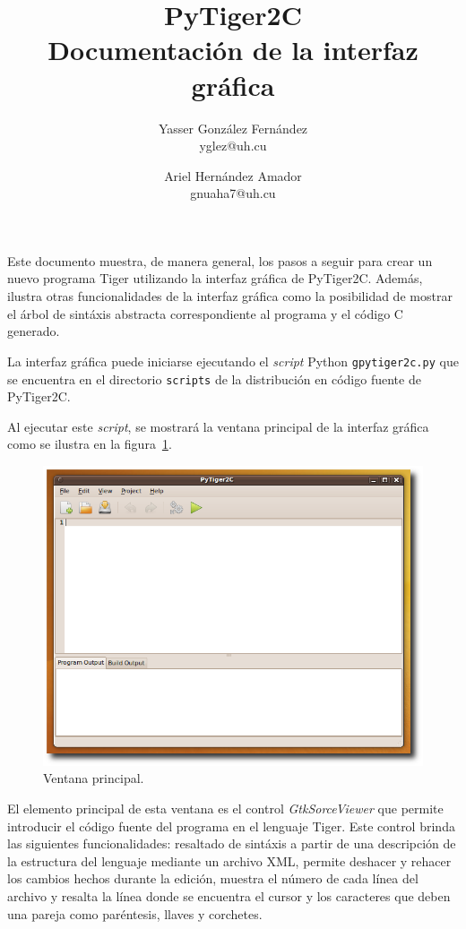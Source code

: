\documentclass{article}
\title{
    \LARGE{PyTiger2C} \\
    \Large{Documentación de la interfaz gráfica}
}
\author{
    Yasser González Fernández \\
    \small{yglez@uh.cu}
    \and
    Ariel Hernández Amador \\
    \small{gnuaha7@uh.cu}
}
\date{}
\begin{document}
\maketitle

\thispagestyle{empty}

\newpage

\setcounter{page}{1}

Este documento muestra, de manera general, los pasos a seguir para crear un
nuevo programa Tiger utilizando la interfaz gráfica de PyTiger2C. Además,
ilustra otras funcionalidades de la interfaz gráfica como la posibilidad de
mostrar el árbol de sintáxis abstracta correspondiente al programa y
el código C generado.

La interfaz gráfica puede iniciarse ejecutando el \emph{script} Python
\texttt{gpytiger2c.py} que se encuentra en el directorio \texttt{scripts}
de la distribución en código fuente de PyTiger2C.

Al ejecutar este \emph{script}, se mostrará la ventana principal de la interfaz
gráfica como se ilustra en la figura~\ref{fig:1-main-window}.

\begin{figure}[htb]
  \centering
  \includegraphics[width=5.5in]{gui/1-main-window}
  \caption{Ventana principal.}
  \label{fig:1-main-window}
\end{figure}

El elemento principal de esta ventana es el control \emph{GtkSorceViewer} que
permite introducir el código fuente del programa en el lenguaje Tiger. Este
control brinda las siguientes funcionalidades: resaltado de sintáxis a partir
de una descripción de la estructura del lenguaje mediante un archivo XML,
permite deshacer y rehacer los cambios hechos durante la edición, muestra el
número de cada línea del archivo y resalta la línea donde se encuentra el cursor
y los caracteres que deben una pareja como paréntesis, llaves y corchetes.
\end{document}
